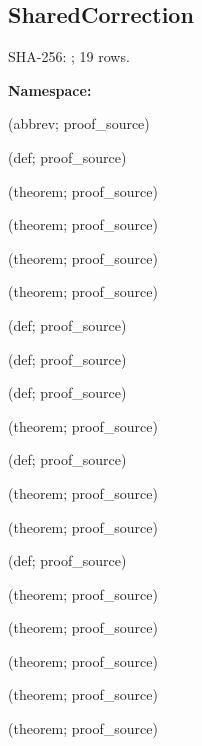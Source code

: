 \subsection*{SharedCorrection}
{\footnotesize SHA-256: ; 19 rows.}\par
\begingroup\small
\textbf{Namespace:} \par
\noindent{} {\scriptsize (abbrev; proof\_source)}\par
\noindent{} {\scriptsize (def; proof\_source)}\par
\noindent{} {\scriptsize (theorem; proof\_source)}\par
\noindent{} {\scriptsize (theorem; proof\_source)}\par
\noindent{} {\scriptsize (theorem; proof\_source)}\par
\noindent{} {\scriptsize (theorem; proof\_source)}\par
\noindent{} {\scriptsize (def; proof\_source)}\par
\noindent{} {\scriptsize (def; proof\_source)}\par
\noindent{} {\scriptsize (def; proof\_source)}\par
\noindent{} {\scriptsize (theorem; proof\_source)}\par
\noindent{} {\scriptsize (def; proof\_source)}\par
\noindent{} {\scriptsize (theorem; proof\_source)}\par
\noindent{} {\scriptsize (theorem; proof\_source)}\par
\noindent{} {\scriptsize (def; proof\_source)}\par
\noindent{} {\scriptsize (theorem; proof\_source)}\par
\noindent{} {\scriptsize (theorem; proof\_source)}\par
\noindent{} {\scriptsize (theorem; proof\_source)}\par
\noindent{} {\scriptsize (theorem; proof\_source)}\par
\noindent{} {\scriptsize (theorem; proof\_source)}\par
\endgroup
